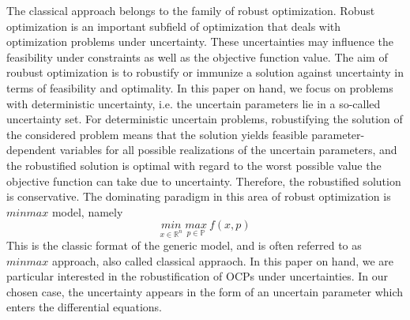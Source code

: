 \documentclass  [
  paper    = a4,
  BCOR     = 10mm,
  twoside,
  fontsize = 12pt,
  fleqn,
  toc      = bibnumbered,
  toc      = listofnumbered,
  numbers  = noendperiod,
  headings = normal,
  listof   = leveldown,
  version  = 3.03
]                                       {scrreprt}
\newcommand{\<}{\langle}
\renewcommand{\>}{\rangle}
\begin{document}
The classical approach belongs to the family of robust optimization. Robust optimization is an important subfield of optimization that deals with optimization problems under uncertainty. These uncertainties may influence the feasibility under constraints as well as the objective function value. The aim of roubust optimization is to robustify or immunize a solution against uncertainty in terms of feasibility and optimality.  In this paper on hand, we focus on problems with deterministic uncertainty, i.e. the uncertain parameters lie in a so-called uncertainty set. For deterministic uncertain problems, robustifying the solution of the considered problem means that the solution yields feasible parameter-dependent variables for all possible realizations of the uncertain parameters, and the robustified solution is optimal with regard to the worst possible value the objective function can take due to uncertainty. Therefore, the robustified solution is conservative. The dominating paradigm in this area of robust optimization is $minmax$ model, namely
\begin{equation}
	\underset{x \in \mathbb{R}^n}{min} \   \underset{p \in \mathbb{P}}{max}  \  f(x,p) 
\end{equation}
This is the classic format of the generic model, and is often referred to as $minmax$ approach, also called classical appraoch. 
In this paper on hand, we are particular interested in the robustification of OCPs under uncertainties. In our chosen case, the uncertainty appears in the form of an uncertain parameter which enters the differential equations.
\end{document}
